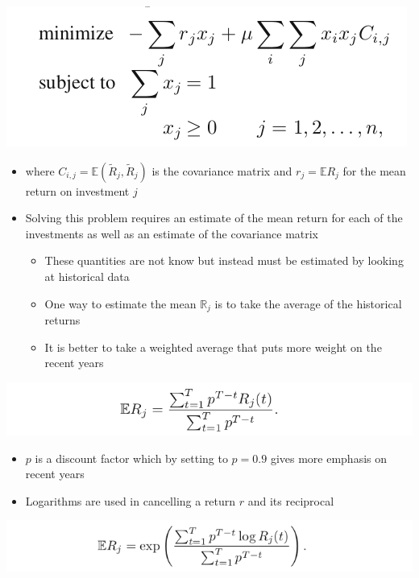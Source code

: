 \documentclass[11pt]{article}
\begin{document}
\begin{center}
\includegraphics[width=.9\linewidth]{Quadratic Programming/screenshot_2019-03-17_14-31-42.png}
\end{center}
\begin{itemize}
\item where \(C_{i,j} = \mathbb E(\tilde R_j, \tilde R_j)\) is the covariance matrix and \(r_j = \mathbb E R_j\) for the mean return on investment \(j\)
\item Solving this problem requires an estimate of the mean return for each of the investments as well as an estimate of the covariance matrix
\begin{itemize}
\item These quantities are not know but instead must be estimated by looking at historical data
\item One way to estimate the mean \(\mathbb R_j\) is to take the average of the historical returns
\item It is better to take a weighted average that puts more weight on the recent years
\end{itemize}
\end{itemize}
\begin{center}
\includegraphics[width=.9\linewidth]{Quadratic Programming/screenshot_2019-03-17_14-47-08.png}
\end{center}
\begin{itemize}
\item \(p\) is a discount factor which by setting to \(p=0.9\) gives more emphasis on recent years
\item Logarithms are used in cancelling a return \(r\) and its reciprocal
\end{itemize}
\begin{center}
\includegraphics[width=.9\linewidth]{Quadratic Programming/screenshot_2019-03-17_14-53-43.png}
\end{center}
\end{document}
